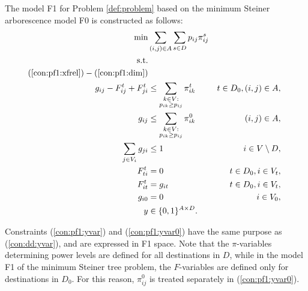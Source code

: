The model F1 for Problem \ref{def:problem} based on the minimum Steiner arborescence model F0 is constructed as follows: 
\begin{subequations}[resume]
\begin{align}
\notag\min & \sum\limits_{(i,j) \in A} \sum\limits_{s \in D} p_{ij} \pi^s_{ij}\\ 
\notag\text{s.t.} && \\
\notag(\ref{con:pf1:xfrel}) - (\ref{con:pf1:dim})\\
\label{con:pf1:yvar} g_{ij} - F^t_{ij}+F^t_{ji} & \leq \sum\limits_{\substack{k\in V: \\ p_{ik}\geq p_{ij}}}\pi^t_{ik}  & t\in D_0, (i,j)\in A,\\
\label{con:pf1:yvar0} g_{ij} & \leq \sum\limits_{\substack{k\in V: \\ p_{ik}\geq p_{ij}}}\pi^0_{ik}   &  (i,j)\in A,\\
\label{con:pf1:B}  \sum_{j\in V_i}g_{ji}&\leq 1 & i\in V\setminus D,\\
\label{con:pf1:noflowFromT} F_{ti}^t&=0 & t\in D_0, i\in V_t,\\
\label{con:pf1:fitt=xit} F_{it}^t&=g_{it} & t\in D_0, i\in V_t,\\
\label{con:pf1:xi0=0} g_{i0}&=0 & i\in V_0,\\
\label{con:pf1:dimy} y&\in \{0,1\}^{A\times D}.
\end{align}~
\end{subequations}

Constraints (\ref{con:pf1:yvar}) and (\ref{con:pf1:yvar0}) have the same purpose as (\ref{con:dd:yvar}), and are expressed in F1 space. %
Note that the $\pi$-variables determining power levels are defined for all destinations in $D$, while in the model F1 \cite{Polzin} of the minimum Steiner tree problem, the $F$-variables are defined only for destinations in $D_0$.
For this reason, $\pi_{ij}^0$ is treated separately in (\ref{con:pf1:yvar0}).

